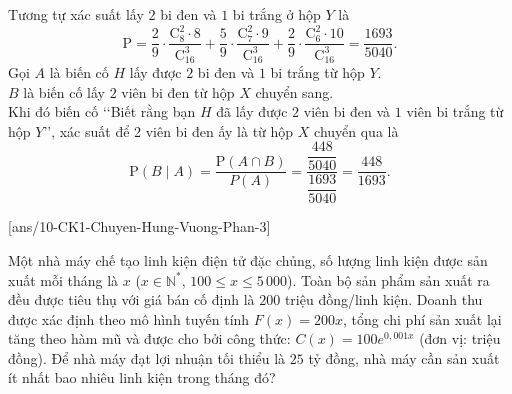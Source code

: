 \begin{ex}
{\begin{itemchoice}
			\itemch Tương tự xác suất lấy $2$ bi đen và $1$ bi trắng ở hộp $Y$ là
			$$\mathrm{P} = \dfrac{2}{9} \cdot \dfrac{\mathrm{C}_8^2 \cdot 8}{\mathrm{C}_{16}^3} + \dfrac{5}{9} \cdot \dfrac{\mathrm{C}_7^2 \cdot 9}{\mathrm{C}_{16}^3} + \dfrac{2}{9} \cdot \dfrac{\mathrm{C}_6^2 \cdot 10}{\mathrm{C}_{16}^3} = \dfrac{1693}{5040}.$$
			\itemch Gọi $A$ là biến cố $H$ lấy được $2$ bi đen và $1$ bi trắng từ hộp $Y$.\\
			$B$ là biến cố lấy $2$ viên bi đen từ hộp $X$ chuyển sang.\\
			Khi đó biến cố \lq\lq Biết rằng bạn $H$ đã lấy được $2$ viên bi đen và $1$ viên bi trắng từ hộp $Y$\rq\rq, xác suất để 2 viên bi đen ấy là từ hộp $X$ chuyển qua là
			$$\mathrm{P} \left(B \mid A\right) = \dfrac{\mathrm{P}(A \cap B)}{P(A)} = \dfrac{\dfrac{448}{5040}}{\dfrac{1693}{5040}} = \dfrac{448}{1693}.$$
		\end{itemchoice}
	}
\end{ex}

\caukq
{}[ans/10-CK1-Chuyen-Hung-Vuong-Phan-3]
\begin{ex}%
	Một nhà máy chế tạo linh kiện điện tử đặc chủng, số lượng linh kiện được sản xuất mỗi tháng là $x$ ($x \in \mathbb{N}^*$, $100 \le x \le 5\,000$). Toàn bộ sản phẩm sản xuất ra đều được tiêu thụ với giá bán cố định là $200$ triệu đồng/linh kiện. Doanh thu được xác định theo mô hình tuyến tính $F(x)=200x$, tổng chi phí sản xuất lại tăng theo hàm mũ và được cho bởi công thức: $C(x)=100e^{0{,}001x}$ (đơn vị: triệu đồng). Để nhà máy đạt lợi nhuận tối thiểu là $25$ tỷ đồng, nhà máy cần sản xuất ít nhất bao nhiêu linh kiện trong tháng đó?
\end{ex}

